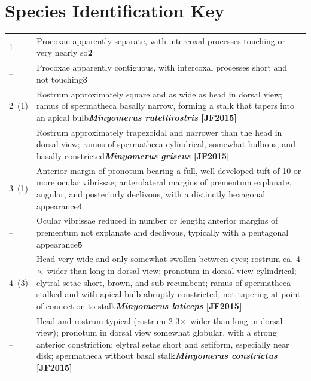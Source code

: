 \documentclass[fleqn,10pt,lineno]{wlpeerj} %
\newcommand{\x}{$\times$~}
\newcommand{\breakfill}{\dotfill\newline\penalty0\hbox{}\nobreak\dotfill}
\begin{document}
\section*{Species Identification Key}\label{sec:idkey}
	\begin{xtabular}{@{}
                p{\dimexpr.1\textwidth-\tabcolsep\relax}
                p{\dimexpr.9\textwidth-\tabcolsep\relax}@{}}
                
		{1} & {Procoxae apparently separate, with intercoxal processes touching or very nearly so}{\dotfill}{\textbf{2}}\\
		{--} & {Procoxae apparently contiguous, with intercoxal processes short and not touching}{\dotfill}{\textbf{3}}\\
		
		{2~(1)} & {Rostrum approximately square and as wide as head in dorsal view; ramus of spermatheca basally narrow, forming a stalk that tapers into an apical bulb}{\breakfill}{\textbf{\textit{Minyomerus rutellirostris} [JF2015]}}\\
		{--} & {Rostrum approximately trapezoidal and narrower than the head in dorsal view; ramus of spermatheca cylindrical, somewhat bulbous, and basally constricted}{\breakfill}{\textbf{\textit{Minyomerus griseus} [JF2015]}}\\
		
		{3~(1)} & {Anterior margin of pronotum bearing a full, well-developed tuft of 10 or more ocular vibrissae; anterolateral margins of prementum explanate, angular, and posteriorly declivous, with a distinctly hexagonal appearance}{\dotfill}{\textbf{4}}\\
		{--} & {Ocular vibrissae reduced in number or length; anterior margins of prementum not explanate and declivous, typically with a pentagonal appearance}{\dotfill}{\textbf{5}}\\
		
		{4~(3)} & {Head very wide and only somewhat swollen between eyes; rostrum ca. 4\x wider than long in dorsal view; pronotum in dorsal view cylindrical; elytral setae short, brown, and sub-recumbent; ramus of spermatheca stalked and with apical bulb abruptly constricted, not tapering at point of connection to stalk}{\dotfill}{\textbf{\textit{Minyomerus laticeps} [JF2015]}}\\
		{--} & {Head and rostrum typical (rostrum 2-3\x wider than long in dorsal view); pronotum in dorsal view somewhat globular, with a strong anterior constriction; elytral setae short and setiform, especially near disk; spermatheca without basal stalk}{\breakfill}{\textbf{\textit{Minyomerus constrictus} [JF2015]}}\\
		

\end{xtabular}
\end{document}
